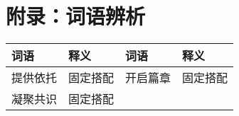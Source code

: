 \section{附录：词语辨析}
\label{sec:appendix}

\begin{longtable}{|p{}|p{}|p{}|p{}|}
    \hline
    \textbf{词语} & \textbf{释义} & \textbf
    {词语}        & \textbf{释义}                  \\
    \hline
    提供依托        & 固定搭配        & 开启篇章    & 固定搭配 \\
    \hline
    凝聚共识        & 固定搭配        &         &      \\
    \hline
\end{longtable}